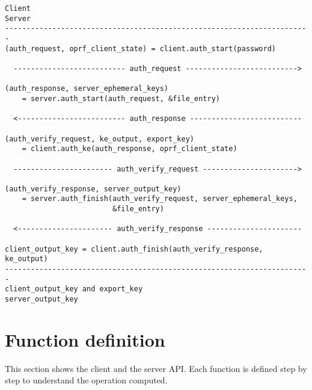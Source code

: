 \documentclass[../report.tex]{subfiles}
\begin{document}
\begin{verbatim}
Client                                                           Server
-----------------------------------------------------------------------
(auth_request, oprf_client_state) = client.auth_start(password)

  -------------------------- auth_request -------------------------->

(auth_response, server_ephemeral_keys) 
    = server.auth_start(auth_request, &file_entry)

  <------------------------- auth_response --------------------------

(auth_verify_request, ke_output, export_key) 
    = client.auth_ke(auth_response, oprf_client_state)

  ----------------------- auth_verify_request ---------------------->

(auth_verify_response, server_output_key) 
    = server.auth_finish(auth_verify_request, server_ephemeral_keys,
                         &file_entry)

  <---------------------- auth_verify_response ----------------------

client_output_key = client.auth_finish(auth_verify_response, ke_output)
-----------------------------------------------------------------------
client_output_key and export_key                      server_output_key
\end{verbatim}


\section{Function definition} \label{sec:impl_function_def}

This section shows the client and the server API.
Each function is defined step by step to understand the operation computed.
\end{document}
